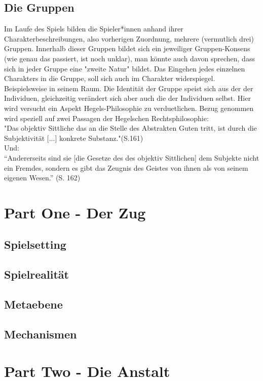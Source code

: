 \documentclass[a4paper, 12pt]{scrartcl}
\begin{document}
    \subsection{Die Gruppen}
    Im Laufe des Spiels bilden die Spieler*innen anhand ihrer Charakterbeschreibungen, also vorherigen Zuordnung, mehrere (vermutlich drei) Gruppen. 
    Innerhalb dieser Gruppen bildet sich ein jeweiliger Gruppen-Konsens (wie genau das passiert, ist noch unklar), man könnte auch davon sprechen, dass sich in jeder Gruppe eine "zweite Natur" bildet. Das Eingehen jedes einzelnen Charakters in die Gruppe, soll sich auch im Charakter widerspiegel. Beispielsweise in seinem Raum. Die Identität der Gruppe speist sich aus der der Individuen, gleichzeitig verändert sich aber auch die der Individuen selbst. Hier wird versucht ein Aspekt Hegels-Philosophie zu verduetlichen. Bezug genommen wird speziell auf zwei Passagen der Hegelschen Rechtsphilosophie: \\
    "Das objektiv Sittliche das an die Stelle des Abstrakten Guten tritt, ist durch die Subjektivität [...] konkrete Substanz."(S.161) \\
    Und:\\
    ``Andererseits sind sie [die Gesetze des des objektiv Sittlichen] dem Subjekte nicht ein Fremdes, sondern es gibt das Zeugnis des Geistes von ihnen als von seinem eigenen Wesen.'' (S. 162)\\

    \section{Part One - Der Zug}
    \subsection{Spielsetting}
    \subsection{Spielrealität}
    \subsection{Metaebene}
    \subsection{Mechanismen}

    \section{Part Two - Die Anstalt}
\end{document}
